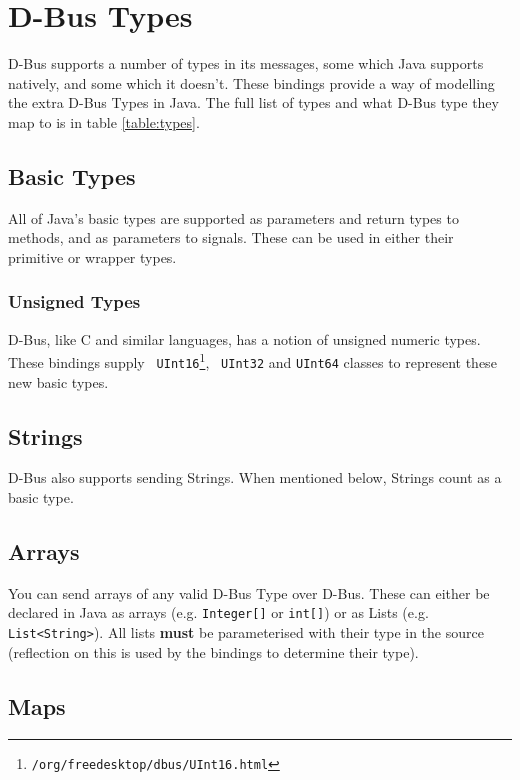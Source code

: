 \documentclass[a4paper,12pt]{article}
\begin{document}
\section{D-Bus Types}

D-Bus supports a number of types in its messages, some which Java
supports natively, and some which it doesn't. These bindings provide
a way of modelling the extra D-Bus Types in Java. The full list of
types and what D-Bus type they map to is in table \ref{table:types}.

\subsection{Basic Types}

All of Java's basic types are supported as parameters and return types to methods, and as parameters to signals. These can be used in either their primitive or wrapper types.

\subsubsection{Unsigned Types}

D-Bus, like C and similar languages, has a notion of unsigned numeric
types. These bindings supply {\tt
UInt16\footnote{\javadocroot/org/freedesktop/dbus/UInt16.html}}, {\tt
UInt32} and {\tt UInt64} classes to represent these new basic types.

\subsection{Strings}

D-Bus also supports sending Strings. When mentioned below, Strings
count as a basic type.

\subsection{Arrays}

You can send arrays of any valid D-Bus Type over D-Bus. These can
either be declared in Java as arrays (e.g. \verb&Integer[]& or
\verb&int[]&) or as Lists (e.g. \verb&List<String>&). All lists {\bf
must} be parameterised with their type in the source (reflection on
this is used by the bindings to determine their type).

\subsection{Maps}
\end{document}
